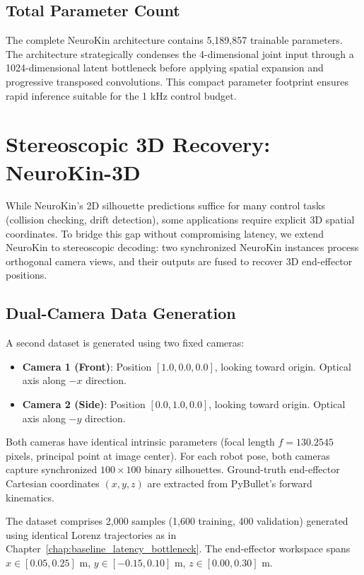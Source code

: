 \documentclass[12pt,a4paper,oneside]{report}
\begin{document}
\subsection{Total Parameter Count}
\label{subsec:total_parameter_count}

The complete NeuroKin architecture contains 5,189,857 trainable parameters. The architecture strategically condenses the 4-dimensional joint input through a 1024-dimensional latent bottleneck before applying spatial expansion and progressive transposed convolutions. This compact parameter footprint ensures rapid inference suitable for the 1 kHz control budget.

\section{Stereoscopic 3D Recovery: NeuroKin-3D}

While NeuroKin's 2D silhouette predictions suffice for many control tasks (collision checking, drift detection), some applications require explicit 3D spatial coordinates. To bridge this gap without compromising latency, we extend NeuroKin to stereoscopic decoding: two synchronized NeuroKin instances process orthogonal camera views, and their outputs are fused to recover 3D end-effector positions.

\subsection{Dual-Camera Data Generation}
\label{subsec:dual_camera_data_generation}

A second dataset is generated using two fixed cameras:

\begin{itemize}
    \item \textbf{Camera 1 (Front)}: Position $[1.0, 0.0, 0.0]$, looking toward origin. Optical axis along $-x$ direction.
    \item \textbf{Camera 2 (Side)}: Position $[0.0, 1.0, 0.0]$, looking toward origin. Optical axis along $-y$ direction.
\end{itemize}

Both cameras have identical intrinsic parameters (focal length $f = 130.2545$ pixels, principal point at image center). For each robot pose, both cameras capture synchronized $100 \times 100$ binary silhouettes. Ground-truth end-effector Cartesian coordinates $(x, y, z)$ are extracted from PyBullet's forward kinematics.

The dataset comprises 2,000 samples (1,600 training, 400 validation) generated using identical Lorenz trajectories as in Chapter~\ref{chap:baseline_latency_bottleneck}. The end-effector workspace spans $x \in [0.05, 0.25]$ m, $y \in [-0.15, 0.10]$ m, $z \in [0.00, 0.30]$ m.
\end{document}
